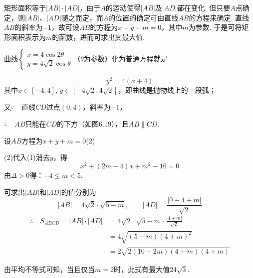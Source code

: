 \begin{analyze}
 矩形面积等于$|AB|\cdot |AD|$，由于$A$的运动使得$|AB|$及$|AD|$都在变化. 但只要$A$点确定，则$|AB|$、$|AD|$随之而定，而$A$的位置的确定可由直线$AB$的方程来确定. 直线$AB$的斜率为$-1$，故可设$AB$的方程为$x+y+m=0$，其中$m$为参数. 于是可将矩形面积表示为$m$的函数，进而可求出其最大值.
\end{analyze}

\begin{solution}
  曲线$\begin{cases}
    x=4\cos2\theta \\ y=4\sqrt{2}\cos\theta
\end{cases}$（$\theta$为参数）化为普通方程就是


\noindent
\begin{minipage}{.5\textwidth}\CTEXindent
\begin{equation}
     y^2=4(x+4) \tag{1}
\end{equation}
    其中$x\in [-4,4]$, $y\in\left[-4\sqrt{2},4\sqrt{2}\right]$，即曲线是抛物线上的一段弧；

又$\because\quad $直线$CD$过点$(0,4)$，斜率为$-1$，

$\therefore\quad AB$只能在$CD$的下方（如图6.19），且$AB\parallel CD$.

设$AB$方程为$x+y+m=0$\hfill(2)

(2)代入(1)消去$y$，得
\[x^2+(2m-4)x+m^2-16=0\]
由$\Delta>0$得：$-4\le m<5$.
\end{minipage}\hfill
\begin{minipage}{.47\textwidth}
    \centering
{}    
\end{minipage}

可求出$|AB|$和$|AD|$的值分别为
\[|AB|=4\sqrt{2}\cdot \sqrt{5-m},\qquad |AD|=\frac{|0+4+m|}{\sqrt{2}}\]
\[\begin{split}
\therefore\quad S_{ABCD}=|AB|\cdot |AD|&=4\sqrt{2}\cdot \sqrt{5-m}\cdot\frac{|4+m|}{\sqrt{2}}\\
&=4\sqrt{(5-m)(4+m)^2}\\
&=2\sqrt{2(10-2m)(4+m)(4+m)}
\end{split}\]

由平均不等式可知，当且仅当$m=2$时，此式有最大值$24\sqrt{3}$.
\end{solution}

